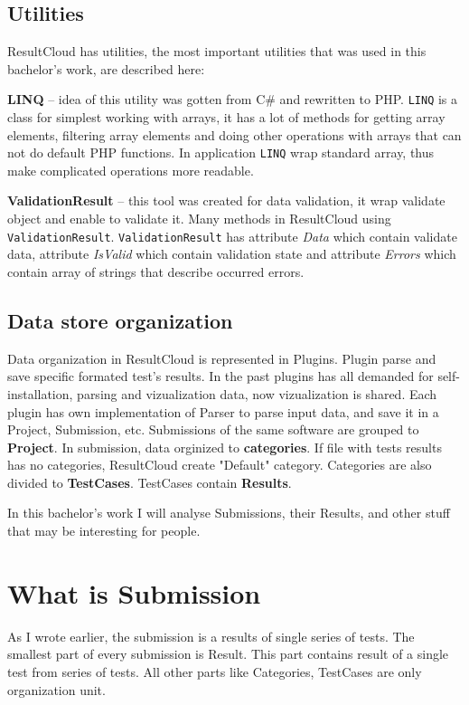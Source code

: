 \subsection{Utilities}

ResultCloud has utilities, the most important utilities that was used in this bachelor's work, are described here:

\textbf{LINQ} -- idea of this utility was gotten from C\# and rewritten to PHP. \texttt{LINQ} is a class for simplest working with arrays, it has a lot of methods for getting array elements, filtering array elements and doing other operations with arrays that can not do default PHP functions. In application \texttt{LINQ} wrap standard array, thus make complicated operations more readable.  

\textbf{ValidationResult} -- this tool was created for data validation, it wrap validate object and enable to validate it. Many methods in ResultCloud using \texttt{ValidationResult}. \texttt{ValidationResult} has attribute \emph{Data} which contain validate data, attribute \emph{IsValid} which contain validation state and attribute \emph{Errors} which contain array of strings that describe occurred errors.

\subsection{Data store organization}

Data organization in ResultCloud is represented in Plugins. Plugin parse and save specific formated test's results. In the past plugins has all demanded for self-installation, parsing and vizualization data, now vizualization is shared. 
Each plugin has own implementation of Parser to parse input data, and save it in a Project, Submission, etc. Submissions of the same software are grouped to \textbf{Project}. In submission, data orginized to \textbf{categories}. If file with tests results has no categories, ResultCloud create "Default" category. Categories are also divided to \textbf{TestCases}. TestCases contain \textbf{Results}.

In this bachelor's work I will analyse Submissions, their Results, and other stuff that may be interesting for people.

\section{What is Submission}

As I wrote earlier, the submission is a results of single series of tests. The smallest part of every submission is Result. This part contains result of a single test from series of tests. All other parts like Categories, TestCases are only organization unit. 

